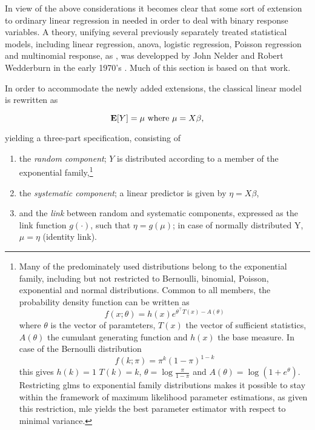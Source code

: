 In view of the above considerations it becomes clear that some sort of extension to ordinary linear regression in needed in order to deal with binary response variables. A theory, unifying several previously separately treated statistical models, including linear regression, \gls{anova}, logistic regression, Poisson regression and multinomial response, as , was developped by John Nelder and Robert Wedderburn in the early 1970's \citep{Nelder1972}. Much of this section is based on that work.

In order to accommodate the newly added extensions, the classical linear model is rewritten as

\begin{equation}
  \operatorname{\mathbf{E}}[Y] = \mu \text{ where } \mu = X \beta,
\end{equation}

yielding a three-part specification, consisting of

\begin{enumerate}[label=(\alph*)]
  \item the \textit{random component}; $Y$ is distributed according to a member of the exponential family,\footnote{Many of the predominately used distributions belong to the exponential family, including but not restricted to Bernoulli, binomial, Poisson, exponential and normal distributions. Common to all members, the probability density function can be written as
  \begin{equation}
    f(x;\theta) = h(x) e^{\theta^\intercal T(x)-A(\theta)}
  \end{equation}
  where $\theta$ is the vector of paramteters, $T(x)$ the vector of sufficient statistics, $A(\theta)$ the cumulant generating function and $h(x)$ the base measure. In case of the Bernoulli distribution
  \begin{equation}
    f(k;\pi) = \pi^k (1-\pi)^{1-k}\label{eq:bern-pmf}
  \end{equation}
  this gives $h(k) = 1$ $T(k) = k$, $\theta = \log\frac{\pi}{1-\pi}$ and $A(\theta) = \log(1+e^\theta)$. Restricting \glspl{glm} to exponential family distributions makes it possible to stay within the framework of maximum likelihood parameter estimations, as given this restriction, \gls{mle} yields the best parameter estimator with respect to minimal variance.}
  \item the \textit{systematic component}; a linear predictor is given by $\eta = X\beta$,
  \item and the \textit{link} between random and systematic components, expressed as the link function $g(\cdot)$, such that $\eta = g(\mu)$; in case of normally distributed Y, $\mu = \eta$ (identity link).
\end{enumerate}

